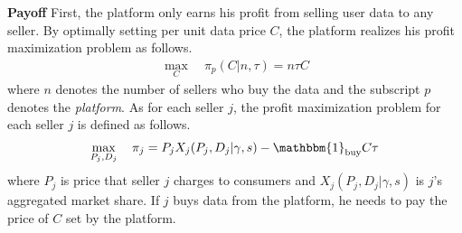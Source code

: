 \documentclass[12pt]{article}
\begin{document}
\textbf{Payoff} \quad First, the platform only earns his profit from selling user data to any seller. By optimally setting per unit data price $C$, the platform realizes his profit maximization problem as follows. 
\begin{align}\label{platform_profit}
\max_{C} \quad \pi_p(C|n, \tau) = n\tau C
\end{align}
where $n$ denotes the number of sellers who buy the data and the subscript $p$ denotes the \textit{platform}. As for each seller $j$, the profit maximization problem for each seller $j$ is defined as follows. 
\begin{align}\label{seller_profit}
\max_{P_j, D_j} \quad \pi_j = P_j X_j(P_j,D_j|\gamma, s) - \mathbbm{1}_{\text{buy}}  C \tau
\end{align}
where $P_j$ is price that seller $j$ charges to consumers and $X_j(P_j,D_j|\gamma, s)$ is $j$'s aggregated market share. If $j$ buys data from the platform, he needs to pay the price of $C$ set by the platform. 
\end{document}

